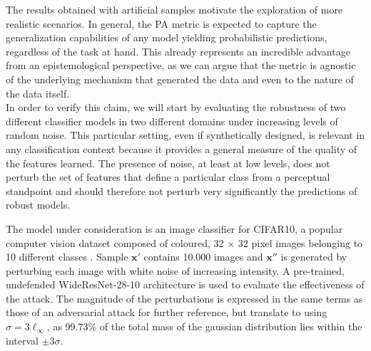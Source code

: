 The results obtained with artificial samples motivate the exploration of more realistic
scenarios. In general, the PA metric is expected to capture the generalization capabilities
of any model yielding probabilistic predictions, regardless of the task at hand. This
already represents an incredible advantage from an epistemological perspective, as we
can argue that the metric is agnostic of the underlying mechanism that generated the data
and even to the nature of the data itself. \\

In order to verify this claim, we will start by evaluating the robustness of two
different classifier models in two different domains under increasing levels of 
random noise. This particular setting, even if synthetically designed, is 
relevant in any classification context because it provides a general measure of the 
quality of the features learned. The presence of noise, at least 
at low levels, does not perturb the set of features that define a particular class from
a perceptual standpoint and should therefore not perturb very significantly the
predictions of robust models.

\begin{experiment}
The model under consideration is an image classifier for CIFAR10, a popular
computer vision dataset composed of coloured, 32 $\times$ 32 pixel images belonging to 10
different classes \cite{krizhevskyLearningMultipleLayers}. Sample
$\bm{x}'$ contains 10.000 images and $\bm{x}''$ is generated 
by perturbing each image with white noise of increasing intensity.
A pre-trained, undefended WideResNet-28-10
\cite{BMVC2016_87}
architecture is used to evaluate the effectiveness of the attack. The 
magnitude of the perturbations is expressed in the same terms as those 
of an adversarial attack for further reference, but translate to 
using $\sigma = 3 \ell_\infty$, as 99.73\% of the
total mass of the gaussian distribution lies within the 
interval $\pm 3\sigma$.
\end{experiment}

